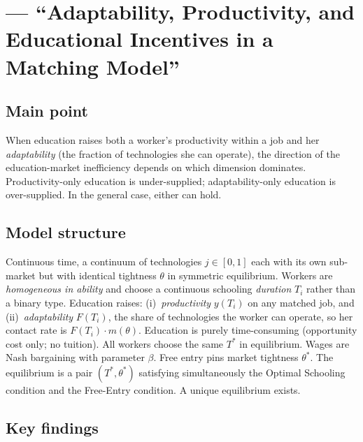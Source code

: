 \documentclass[12pt]{article}
\begin{document}
\section{\citet{charlot2005b} --- ``Adaptability, Productivity, and Educational Incentives in a Matching Model''}

\subsection*{Main point}

When education raises both a worker's productivity within a job and her \emph{adaptability} (the fraction of technologies she can operate), the direction of the education-market inefficiency depends on which dimension dominates. Productivity-only education is under-supplied; adaptability-only education is over-supplied. In the general case, either can hold.

\subsection*{Model structure}

Continuous time, a continuum of technologies $j \in [0,1]$ each with its own sub-market but with identical tightness $\theta$ in symmetric equilibrium. Workers are \emph{homogeneous in ability} and choose a continuous schooling \emph{duration} $T_i$ rather than a binary type. Education raises: (i)~\emph{productivity} $y(T_i)$ on any matched job, and (ii)~\emph{adaptability} $F(T_i)$, the share of technologies the worker can operate, so her contact rate is $F(T_i) \cdot m(\theta)$. Education is purely time-consuming (opportunity cost only; no tuition). All workers choose the same $T^*$ in equilibrium. Wages are Nash bargaining with parameter $\beta$. Free entry pins market tightness $\theta^*$. The equilibrium is a pair $(T^*, \theta^*)$ satisfying simultaneously the Optimal Schooling condition and the Free-Entry condition. A unique equilibrium exists.

\subsection*{Key findings}
\end{document}
